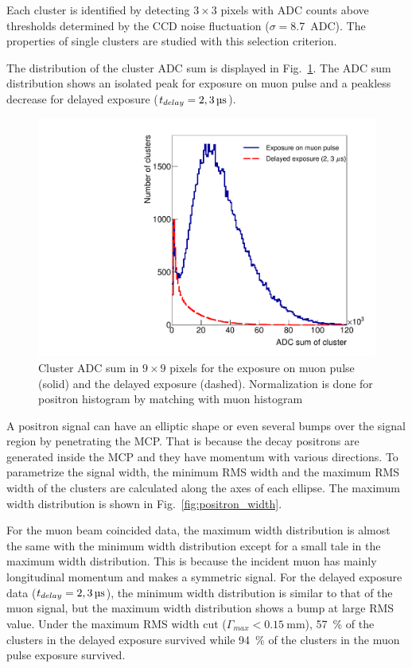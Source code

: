 \documentclass[preprint,3p,twocolumn]{elsarticle}
\begin{document}
Each cluster is identified by detecting $3 \times 3$ pixels with
ADC counts above thresholds determined by the CCD noise
fluctuation ($\sigma=$\SI{8.7}{ADC}). The properties of single
clusters are studied with this selection criterion.


The distribution of the cluster ADC sum is displayed in
Fig.~\ref{fig:BPM_int}.  The ADC sum distribution shows an
isolated peak for exposure on muon pulse and a peakless decrease
for delayed exposure
($t_{delay} = \SIlist[list-pair-separator = {, }, list-units =
single]{2; 3}{\micro\s}$).

\begin{figure}[tbp]
	\centering
	\includegraphics[width=\columnwidth]{figure/Integ_legend_v2.pdf}
	\caption{Cluster ADC sum in $9\times9$ pixels for the
          exposure on muon pulse (solid) and the delayed exposure
          (dashed).  Normalization is done for positron histogram
          by matching with muon histogram}
	\vspace{-0.2cm}
	\label{fig:BPM_int}
\end{figure}

A positron signal can have an elliptic shape or even several
bumps over the signal region by penetrating the MCP. That is
because the decay positrons are generated inside the MCP and they
have momentum with various directions.  To parametrize the signal
width, the minimum RMS width and the maximum RMS width of the
clusters are calculated along the axes of each ellipse. The
maximum width distribution is shown in
Fig.~\ref{fig:positron_width}.

For the muon beam coincided data, the maximum width distribution
is almost the same with the minimum width distribution except for
a small tale in the maximum width distribution. This is because
the incident muon has mainly longitudinal momentum and makes a
symmetric signal.  For the delayed exposure data
($t_{delay} = \SIlist[list-pair-separator = {, }, list-units =
single]{2; 3}{\micro\s}$), the minimum width distribution is
similar to that of the muon signal, but the maximum width
distribution shows a bump at large RMS value. Under the maximum
RMS width cut ($\Gamma_{max} < \SI{0.15}{\mm}$),
\SI{57}{\percent} of the clusters in the delayed exposure
survived while \SI{94}{\percent} of the clusters in the muon
pulse exposure survived.
\end{document}
